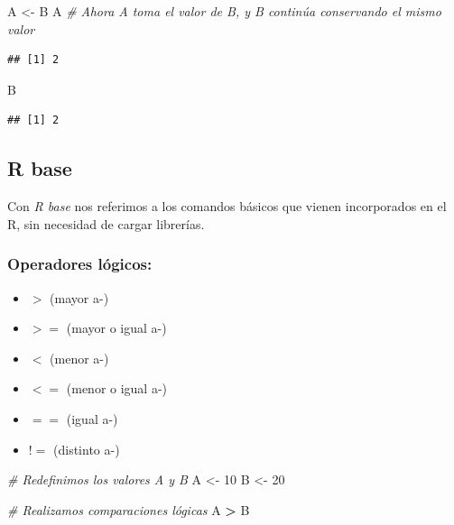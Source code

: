 \documentclass[]{book}
\newenvironment{Shaded}{\begin{snugshade}}{\end{snugshade}}
\newcommand{\CommentTok}[1]{\textcolor[rgb]{0.56,0.35,0.01}{\textit{#1}}}
\newcommand{\DecValTok}[1]{\textcolor[rgb]{0.00,0.00,0.81}{#1}}
\newcommand{\NormalTok}[1]{#1}
\newcommand{\OperatorTok}[1]{\textcolor[rgb]{0.81,0.36,0.00}{\textbf{#1}}}
\newcommand{\StringTok}[1]{\textcolor[rgb]{0.31,0.60,0.02}{#1}}
\providecommand{\tightlist}{%
  \setlength{\itemsep}{0pt}\setlength{\parskip}{0pt}}
\begin{document}
\begin{Shaded}
\begin{Highlighting}[]
\NormalTok{A <-}\StringTok{ }\NormalTok{B}
\NormalTok{A      }\CommentTok{# Ahora A toma el valor de B, y B continúa conservando el mismo valor}
\end{Highlighting}
\end{Shaded}

\begin{verbatim}
## [1] 2
\end{verbatim}

\begin{Shaded}
\begin{Highlighting}[]
\NormalTok{B}
\end{Highlighting}
\end{Shaded}

\begin{verbatim}
## [1] 2
\end{verbatim}

\hypertarget{r-base}{%
\subsection{R base}\label{r-base}}

Con \emph{R base} nos referimos a los comandos básicos que vienen incorporados en el R, sin necesidad de cargar librerías.

\hypertarget{operadores-logicos}{%
\subsubsection{Operadores lógicos:}\label{operadores-logicos}}

\begin{itemize}
\tightlist
\item
  \(>\) (mayor a-)
\item
  \(>=\) (mayor o igual a-)
\item
  \(<\) (menor a-)
\item
  \(<=\) (menor o igual a-)
\item
  \(==\) (igual a-)
\item
  \(!=\) (distinto a-)
\end{itemize}

\begin{Shaded}
\begin{Highlighting}[]
\CommentTok{# Redefinimos los valores A y B}
\NormalTok{A <-}\StringTok{ }\DecValTok{10}
\NormalTok{B <-}\StringTok{ }\DecValTok{20}

\CommentTok{# Realizamos comparaciones lógicas}
\NormalTok{A }\OperatorTok{>}\StringTok{  }\NormalTok{B}
\end{Highlighting}
\end{Shaded}
\end{document}

